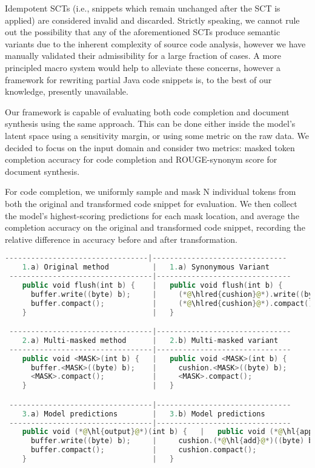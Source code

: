 \documentclass[sigconf,review,anonymous]{acmart}
\DeclareRobustCommand{\hlred}[1]{{\sethlcolor{pink}\hl{#1}}}
\begin{document}
  Idempotent SCTs (i.e., snippets which remain unchanged after the SCT is applied) are considered invalid and discarded. Strictly speaking, we cannot rule out the possibility that any of the aforementioned SCTs produce semantic variants due to the inherent complexity of source code analysis, however we have manually validated their admissibility for a large fraction of cases. A more principled macro system would help to alleviate these concerns, however a framework for rewriting partial Java code snippets is, to the best of our knowledge, presently unavailable.

  Our framework is capable of evaluating both code completion and document synthesis using the same approach. This can be done either inside the model's latent space using a sensitivity margin, or using some metric on the raw data. We decided to focus on the input domain and consider two metrics: masked token completion accuracy for code completion and ROUGE-synonym score for document synthesis.

  \pagebreak

  For code completion, we uniformly sample and mask N individual tokens from both the original and transformed code snippet for evaluation. We then collect the model's highest-scoring predictions for each mask location, and average the completion accuracy on the original and transformed code snippet, recording the relative difference in accuracy before and after transformation.

  \begin{lstlisting}[basicstyle=\scriptsize\ttfamily, language=kotlin,label={lst:example2}]
 ---------------------------------|-------------------------------
    1.a) Original method          |   1.a) Synonymous Variant
 ---------------------------------|-------------------------------
    public void flush(int b) {    |   public void flush(int b) {
      buffer.write((byte) b);     |     (*@\hlred{cushion}@*).write((byte) b);
      buffer.compact();           |     (*@\hlred{cushion}@*).compact();
    }                             |   }

 ---------------------------------|-------------------------------
    2.a) Multi-masked method      |   2.b) Multi-masked variant
 ---------------------------------|-------------------------------
    public void <MASK>(int b) {   |   public void <MASK>(int b) {
      buffer.<MASK>((byte) b);    |     cushion.<MASK>((byte) b);
      <MASK>.compact();           |     <MASK>.compact();
    }                             |   }

 ---------------------------------|-------------------------------
    3.a) Model predictions        |   3.b) Model predictions
 ---------------------------------|-------------------------------
    public void (*@\hl{output}@*)(int b) {   |   public void (*@\hl{append}@*)(int b) {
      buffer.write((byte) b);     |     cushion.(*@\hl{add}@*)((byte) b);
      buffer.compact();           |     cushion.compact();
    }                             |   }
  \end{lstlisting}
\end{document}
